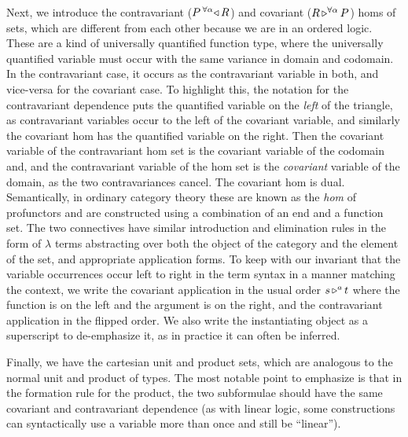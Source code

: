 \documentclass{llncs}
\begin{document}
Next, we introduce the contravariant ($\homlallXYtoZ \alpha R P$) and
covariant ($\homrallXYtoZ \alpha R P$) homs of sets, which are
different from each other because we are in an ordered logic.
%
These are a kind of universally quantified
function type, where the universally quantified variable must occur
with the same variance in domain and codomain. In the contravariant
case, it occurs as the contravariant variable in both, and vice-versa
for the covariant case.
%
To highlight this, the notation for the contravariant dependence puts
the quantified variable on the \emph{left} of the triangle, as
contravariant variables occur to the left of the covariant variable,
and similarly the covariant hom has the quantified variable on the
right.
%
Then the
covariant variable of the contravariant hom set is the covariant
variable of the codomain and, and the contravariant variable of the
hom set is the \emph{covariant} variable of the domain, as the two
contravariances cancel. The covariant hom is dual.
%
Semantically, in ordinary category theory these are known as the
\emph{hom} of profunctors and are constructed using a combination of
an end and a function set.
%
The two connectives have similar introduction and elimination rules in
the form of $\lambda$ terms abstracting over both the object of the
category and the element of the set, and appropriate application
forms.
%
To keep with our invariant that the variable occurrences occur left to
right in the term syntax in a manner matching the context, we write
the covariant application in the usual order $\homrappXtoYatZ s t a$
where the function is on the left and the argument is on the right,
and the contravariant application in the flipped order.
%
We also write the instantiating object as a superscript to
de-emphasize it, as in practice it can often be inferred.

Finally, we have the cartesian unit and product sets, which are
analogous to the normal unit and product of types. The most notable
point to emphasize is that in the formation rule for the product, the
two subformulae should have the same covariant and contravariant
dependence (as with linear logic, some constructions can
syntactically use a variable more than once and still be ``linear'').  
\end{document}
